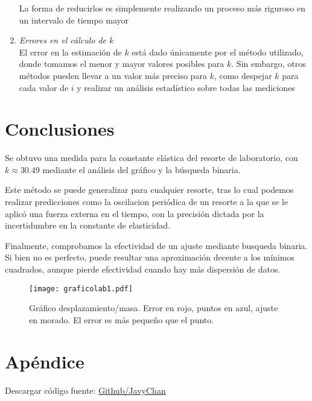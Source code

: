 \documentclass{article}
\begin{document}
\begin{multicols}{2}
\begin{enumerate}[start=1, label={\bfseries \arabic*})]
La forma de reducirlos es simplemente realizando un proceso más riguroso en un intervalo de tiempo mayor 
\item \emph{Errores en el cálculo de $k$}\\
El error en la estimación de $k$ está dado únicamente por el método utilizado, donde tomamos el menor y mayor valores posibles para $k$. Sin embargo, otros métodos pueden llevar a un valor más preciso para $k$, como despejar $k$ para cada valor de $i$ y realizar un análisis estadístico sobre todas las mediciones
\end{enumerate}

\centering
    \section{Conclusiones}
\raggedright

Se obtuvo una medida para la constante elástica del resorte de laboratorio, con $k\approx 30.49$ mediante el análisis del gráfico y la búsqueda binaria. 

Este método se puede generalizar para cualquier resorte, tras lo cual podemos realizar predicciones como la oscilacion periódica de un resorte a la que se le aplicó una fuerza externa en el tiempo, con la precisión dictada por la incertidumbre en la constante de elasticidad.

Finalmente, comprobamos la efectividad de un ajuste mediante busqueda binaria. Si bien no es perfecto, puede resultar una aproximación decente a los mínimos cuadrados, aunque pierde efectividad cuando hay más dispersión de datos.
\end{multicols}
\begin{figure}
    \centering
    \texttt{[image: graficolab1.pdf]}
    \caption{Gráfico desplazamiento/masa. Error en rojo, puntos en azul, ajuste en morado. El error es más pequeño que el punto.}
    \label{fig:grafico_desp-masa}
\end{figure}
\newpage
\section{Apéndice}
Descargar código fuente: \href{https://github.com/JavyChan/Tarea-Lab1}{Github/JavyChan}
\end{document}
